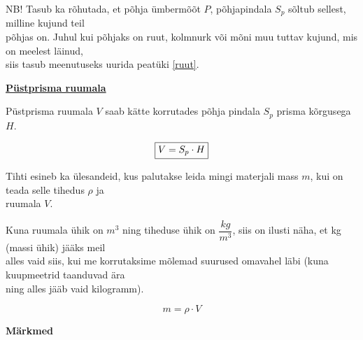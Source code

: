 \begin{center}
{{{\begin{flushleft}
\vspace{2mm}
\hspace{5mm}
NB! Tasub ka rõhutada, et põhja ümbermõõt $P$, põhjapindala $S_{p}$ sõltub sellest, milline kujund teil\\ \hspace{5mm} põhjas on. Juhul kui põhjaks on ruut, kolmnurk või mõni muu tuttav kujund, mis on meelest läinud,\\ \hspace{5mm} siis tasub meenutuseks uurida peatüki \ref{ruut}.

\vspace{5mm}
\hspace{5mm}
\textbf{\underline{Püstprisma ruumala}}

\vspace{2mm}
\hspace{5mm}
Püstprisma ruumala $V$ saab kätte korrutades põhja pindala $S_{p}$ prisma kõrgusega $H$.

\begin{equation}
\label{18_5}
\fbox{$V = S_{p} \cdot H$}
\end{equation}

\vspace{2mm}
\hspace{5mm}
Tihti esineb ka ülesandeid, kus palutakse leida mingi materjali mass $m$, kui on teada selle tihedus $\rho$ ja\\ \hspace{5mm} ruumala $V$. 

\vspace{2mm}
\hspace{5mm}
Kuna ruumala ühik on $m^{3}$ ning tiheduse ühik on $\dfrac{kg}{m^{3}}$, siis on ilusti näha, et kg (massi ühik) jääks meil\\ \hspace{5mm} alles vaid siis, kui me korrutaksime mõlemad suurused omavahel läbi (kuna kuupmeetrid taanduvad ära\\ \hspace{5mm} ning alles jääb vaid kilogramm).

\begin{equation}
\label{18_6}
m = \rho \cdot V
\end{equation}
\end{flushleft}
}}}
\end{center}



\newpage

\vspace{0.5cm}

\textbf{Märkmed}\\
\vspace{2mm}
\begin{mdframed}[style=graphpaper]
\vspace{21cm}
\end{mdframed}
